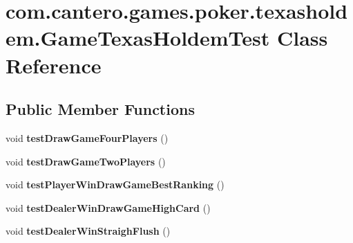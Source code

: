 \hypertarget{classcom_1_1cantero_1_1games_1_1poker_1_1texasholdem_1_1_game_texas_holdem_test}{}\section{com.\+cantero.\+games.\+poker.\+texasholdem.\+Game\+Texas\+Holdem\+Test Class Reference}
\label{classcom_1_1cantero_1_1games_1_1poker_1_1texasholdem_1_1_game_texas_holdem_test}
\subsection*{Public Member Functions}
\begin{DoxyCompactItemize}
\item 
\hypertarget{classcom_1_1cantero_1_1games_1_1poker_1_1texasholdem_1_1_game_texas_holdem_test_aee1b571242c66b572cd17021a5f9e706}{}void {\bfseries test\+Draw\+Game\+Four\+Players} ()\label{classcom_1_1cantero_1_1games_1_1poker_1_1texasholdem_1_1_game_texas_holdem_test_aee1b571242c66b572cd17021a5f9e706}

\item 
\hypertarget{classcom_1_1cantero_1_1games_1_1poker_1_1texasholdem_1_1_game_texas_holdem_test_acc79fe9b4ad8a6cb7aac5382762053dc}{}void {\bfseries test\+Draw\+Game\+Two\+Players} ()\label{classcom_1_1cantero_1_1games_1_1poker_1_1texasholdem_1_1_game_texas_holdem_test_acc79fe9b4ad8a6cb7aac5382762053dc}

\item 
\hypertarget{classcom_1_1cantero_1_1games_1_1poker_1_1texasholdem_1_1_game_texas_holdem_test_a484868599f01a37347831b8f17d8836c}{}void {\bfseries test\+Player\+Win\+Draw\+Game\+Best\+Ranking} ()\label{classcom_1_1cantero_1_1games_1_1poker_1_1texasholdem_1_1_game_texas_holdem_test_a484868599f01a37347831b8f17d8836c}

\item 
\hypertarget{classcom_1_1cantero_1_1games_1_1poker_1_1texasholdem_1_1_game_texas_holdem_test_a7c941abf35fa8da62bef67d41f6323a0}{}void {\bfseries test\+Dealer\+Win\+Draw\+Game\+High\+Card} ()\label{classcom_1_1cantero_1_1games_1_1poker_1_1texasholdem_1_1_game_texas_holdem_test_a7c941abf35fa8da62bef67d41f6323a0}

\item 
\hypertarget{classcom_1_1cantero_1_1games_1_1poker_1_1texasholdem_1_1_game_texas_holdem_test_a6ae776da0ca7d2b4e7353782730c9ba6}{}void {\bfseries test\+Dealer\+Win\+Straigh\+Flush} ()\label{classcom_1_1cantero_1_1games_1_1poker_1_1texasholdem_1_1_game_texas_holdem_test_a6ae776da0ca7d2b4e7353782730c9ba6}


\end{DoxyCompactItemize}
